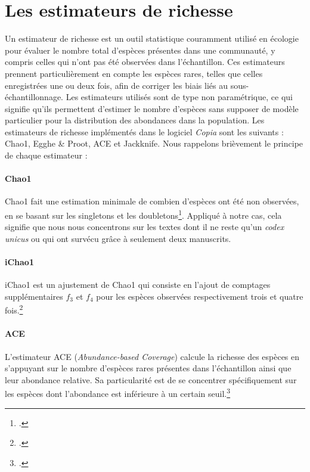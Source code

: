 \documentclass[a4paper,twoside,12pt]{book}
\begin{document}
\section{Les estimateurs de richesse}

Un estimateur de richesse est un outil statistique couramment utilisé en écologie pour évaluer le nombre total d’espèces présentes dans une communauté, y compris celles qui n’ont pas été observées dans l’échantillon. Ces estimateurs prennent particulièrement en compte les espèces rares, telles que celles enregistrées une ou deux fois, afin de corriger les biais liés au sous-échantillonnage. Les estimateurs utilisés sont de type non paramétrique, ce qui signifie qu’ils permettent d’estimer le nombre d’espèces sans supposer de modèle particulier pour la distribution des abondances dans la population. Les estimateurs de richesse implémentés dans le logiciel \textit{Copia} sont les suivants : Chao1, Egghe \& Proot, ACE et Jackknife. Nous rappelons brièvement le principe de chaque estimateur :



\paragraph{Chao1}Chao1 fait une estimation minimale de combien d’espèces ont été non observées, en se basant sur les singletons et les doubletons\footcite{chao1984nonparametric}. Appliqué à notre cas, cela signifie que nous nous concentrons sur les textes dont il ne reste qu’un \textit{codex unicus} ou qui ont survécu grâce à seulement deux manuscrits.


\paragraph{iChao1}iChao1 est un ajustement de Chao1 qui consiste en l'ajout de comptages supplémentaires $f_3$ et $f_4$ pour les espèces observées respectivement trois et quatre fois.\footcite{chiu2014improved}


\paragraph{ACE}L’estimateur ACE (\textit{Abundance-based Coverage}) calcule la richesse des espèces en s’appuyant sur le nombre d’espèces rares présentes dans l’échantillon ainsi que leur abondance relative. Sa particularité est de se concentrer spécifiquement sur les espèces dont l’abondance est inférieure à un certain seuil.\footcite{chao1992coverage}
\end{document}
